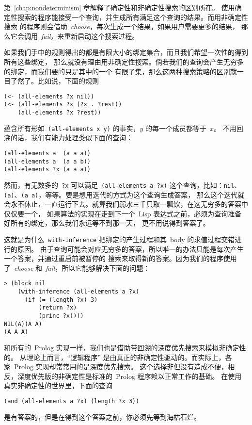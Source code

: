 第~\ref{chap:nondeterminism} 章解释了确定性和非确定性搜索的区别所在。
使用确定性搜索的程序能接受一个查询，并生成所有满足这个查询的结果。而用非确定性搜索
的程序则会借助~\emph{choose}，每次生成一个结果，如果用户需要更多的结果，
那么它会调用~\emph{fail}，来重新启动这个搜索过程。

如果我们手中的规则得出的都是有限大小的绑定集合，而且我们希望一次性的得到所有这些绑定，
那么就没有理由用非确定性搜索。倘若我们的查询会产生无穷多的绑定，而我们要的只是其中的一个
有限子集，那么这两种搜索策略的区别就一目了然了。比如说，下面的规则
\begin{lstlisting}
(<- (all-elements ?x nil))
(<- (all-elements ?x (?x . ?rest))
    (all-elements ?x ?rest))
\end{lstlisting}
蕴含所有形如~\verb|(all-elements x y)| 的事实，$y$ 的每一个成员都等于~$x$。
不用回溯的话，我们有能力处理类似下面的查询：
\begin{lstlisting}
(all-elements a  (a a a))
(all-elements a  (a a b))
(all-elements ?x (a a a))
\end{lstlisting}
然而，有无数多的~\verb|?x| 可以满足~\verb|(all-elements a ?x)| 这个查询，比如：\verb|nil|、
\verb|(a)|、\verb|(a a)|，等等。要是想用迭代的方式为这个查询生成答案，
那么这个迭代就会永不休止，一直运行下去。就算我们弱水三千只取一瓢饮，在这无穷多的答案中仅仅要一个，
如果算法的实现在走到下一个~Lisp 表达式之前，必须为查询准备好所有的绑定，那么我们永远等不到那一天，
更不用说得到答案了。

这就是为什么~\verb|with-inference| 把绑定的产生过程和其~body 的求值过程交错进行的原因。
由于查询可能会对应无穷多的答案，所以唯一的办法只能是每次产生一个答案，并通过重启前被暂停的
搜索来取得新的答案。因为我们的程序使用了~\emph{choose} 和~\emph{fail}，所以它能够解决下面的问题：
\begin{lstlisting}
> (block nil
    (with-inference (all-elements a ?x)
      (if (= (length ?x) 3)
          (return ?x)
          (princ ?x))))
NIL(A)(A A)
(A A A)
\end{lstlisting}

和所有的~Prolog 实现一样，我们也是借助带回溯的深度优先搜索来模拟非确定性的。
从理论上而言，``逻辑程序'' 是由真正的非确定性驱动的。而实际上，各家~Prolog 实现却常常用的是深度优先搜索。
这个选择非但没有造成不便，相反，深度优先版的非确定性是标准的~Prolog 程序赖以正常工作的基础。
在使用真实非确定性的世界里，下面的查询
\begin{lstlisting}
(and (all-elements a ?x) (length ?x 3))
\end{lstlisting}
是有答案的，但是在得到这个答案之前，你必须先等到海枯石烂。

